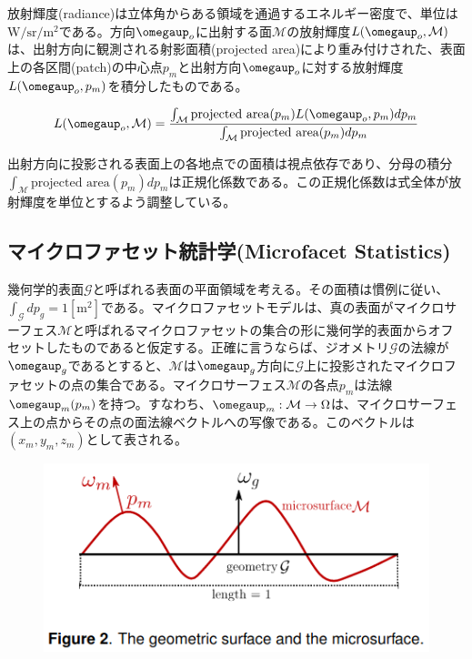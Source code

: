 \documentclass[a4j,xelatex,ja=standard]{bxjsarticle}
\begin{document}
放射輝度(radiance)は立体角からある領域を通過するエネルギー密度で、単位は$\text{W}/\text{sr}/\text{m}^2$である。方向$\boldsymbol{\omegaup}_o$に出射する面$\mathcal M$の放射輝度$L(\boldsymbol{\omegaup}_o, \mathcal{M})$は、出射方向に観測される射影面積(projected area)により重み付けされた、表面上の各区間(patch)の中心点$p_m$と出射方向$\boldsymbol{\omegaup}_o$に対する放射輝度$L(\boldsymbol{\omegaup}_o, p_m)$を積分したものである。

\begin{equation}
    L(\boldsymbol{\omegaup}_o, \mathcal{M}) = \frac{\int_{\mathcal M} \text{projected area}(p_m) L(\boldsymbol{\omegaup}_o, p_m) dp_m}{\int_{\mathcal M} \text{projected area}(p_m) dp_m}
    \label{eq:1}
\end{equation}

出射方向に投影される表面上の各地点での面積は視点依存であり、分母の積分$\int_{\mathcal M} \text{projected area}(p_m) dp_m$は正規化係数である。この正規化係数は式全体が放射輝度を単位とするよう調整している。

\subsection{マイクロファセット統計学(Microfacet Statistics)}

幾何学的表面$\mathcal G$と呼ばれる表面の平面領域を考える。その面積は慣例に従い、$\int_{\mathcal G}dp_g = 1 [\text{m}^2]$である。マイクロファセットモデルは、真の表面がマイクロサーフェス$\mathcal M$と呼ばれるマイクロファセットの集合の形に幾何学的表面からオフセットしたものであると仮定する。正確に言うならば、ジオメトリ$\mathcal G$の法線が$\boldsymbol{\omegaup}_g$であるとすると、$\mathcal M$は$\boldsymbol{\omegaup}_g$方向に$\mathcal G$上に投影されたマイクロファセットの点の集合である。マイクロサーフェス$\mathcal M$の各点$p_m$は法線$\boldsymbol{\omegaup}_m(p_m)$を持つ。すなわち、$\boldsymbol{\omegaup}_m : \mathcal{M} \rightarrow \Omega$は、マイクロサーフェス上の点からその点の面法線ベクトルへの写像である。このベクトルは$(x_m, y_m, z_m)$として表される。

\begin{figure}
    \includegraphics[width=\textwidth]{Figure2.png}
    \caption{}
    \label{fig:2}
\end{figure}
\end{document}
